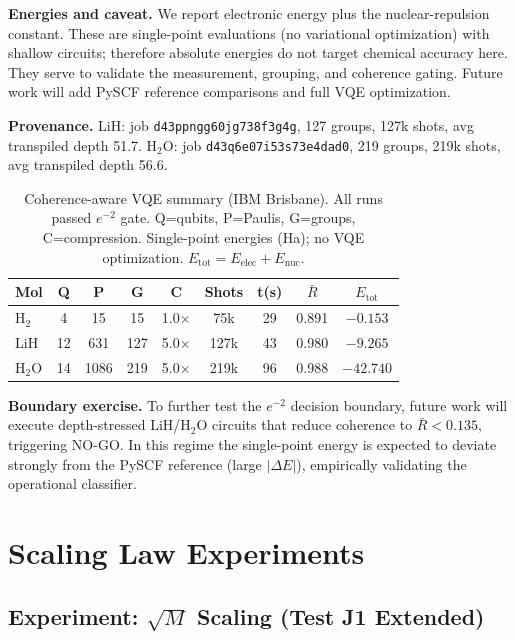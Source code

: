 \documentclass[10pt,twocolumn]{article}
\begin{document}
\textbf{Energies and caveat.} We report electronic energy plus the nuclear-repulsion constant. These are single-point evaluations (no variational optimization) with shallow circuits; therefore absolute energies do not target chemical accuracy here. They serve to validate the measurement, grouping, and coherence gating. Future work will add PySCF reference comparisons and full VQE optimization.

\textbf{Provenance.} LiH: job \texttt{d43ppngg60jg738f3g4g}, 127 groups, 127k shots, avg transpiled depth 51.7. H$_2$O: job \texttt{d43q6e07i53s73e4dad0}, 219 groups, 219k shots, avg transpiled depth 56.6.

\begin{table}[h]
\centering
\footnotesize
\setlength{\tabcolsep}{3pt}
\begin{tabular}{lcccccccc}
\hline
\textbf{Mol} & \textbf{Q} & \textbf{P} & \textbf{G} & \textbf{C} & \textbf{Shots} & \textbf{t(s)} & $\bar{R}$ & $E_{\text{tot}}$ \\
\hline
H$_2$ & 4 & 15 & 15 & 1.0$\times$ & 75k & 29 & 0.891 & $-0.153$ \\
LiH & 12 & 631 & 127 & 5.0$\times$ & 127k & 43 & 0.980 & $-9.265$ \\
H$_2$O & 14 & 1086 & 219 & 5.0$\times$ & 219k & 96 & 0.988 & $-42.740$ \\
\hline
\end{tabular}
\caption{Coherence-aware VQE summary (IBM Brisbane). All runs passed $e^{-2}$ gate. Q=qubits, P=Paulis, G=groups, C=compression. Single-point energies (Ha); no VQE optimization. $E_{\text{tot}} = E_{\text{elec}} + E_{\text{nuc}}$.}
\label{tab:chemistry_summary}
\end{table}

\textbf{Boundary exercise.} To further test the $e^{-2}$ decision boundary, future work will execute depth-stressed LiH/H$_2$O circuits that reduce coherence to $\bar{R} < 0.135$, triggering NO-GO. In this regime the single-point energy is expected to deviate strongly from the PySCF reference (large $|\Delta E|$), empirically validating the operational classifier.

\section{Scaling Law Experiments}

\subsection{Experiment: $\sqrt{M}$ Scaling (Test J1 Extended)}
\end{document}

